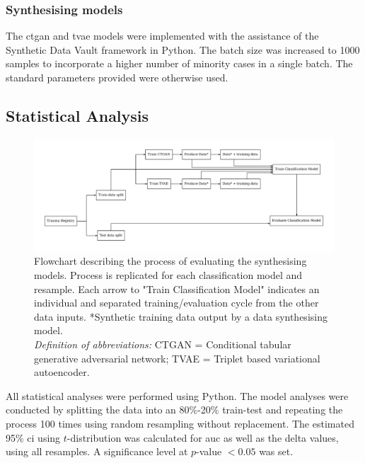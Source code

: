 \documentclass[12pt, letterpaper]{article}
\begin{document}
\subsubsection*{Synthesising models}
The \acrfull{ctgan} \cite{xu_modeling_2019} and \acrfull{tvae} \cite{ishfaq_tvae_2018} models were implemented with the assistance of the Synthetic Data Vault framework \cite{patki_sdv_2016} in Python. The batch size was increased to 1000 samples to incorporate a higher number of minority cases in a single batch. The standard parameters provided were otherwise used.

\subsection{Statistical Analysis}
\begin{figure}[h]
    \centering
    \includegraphics[width=\textwidth]{figures/model_flowchart.pdf}
    \caption{Flowchart describing the process of evaluating the synthesising models. Process is replicated for each classification model and resample. Each arrow to "Train Classification Model" indicates an individual and separated training/evaluation cycle from the other data inputs. *Synthetic training data output by a data synthesising model.\\ \textit{Definition of abbreviations:} CTGAN = Conditional tabular generative adversarial network; TVAE = Triplet based variational autoencoder.}
    \label{fig:modelflowchart}
\end{figure}

All statistical analyses were performed using Python. The model analyses were conducted by splitting the data into an 80\%-20\% train-test and repeating the process 100 times using random resampling without replacement. The estimated 95\% \acrfull{ci} using $t$-distribution was calculated for \acrfull{auc} as well as the delta values, using all resamples. A significance level at $p$-value $< 0.05$ was set.
\end{document}
